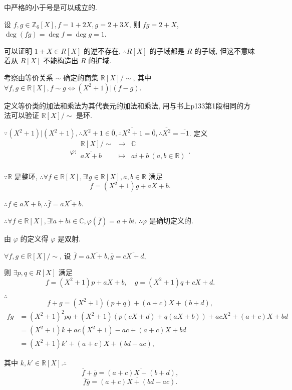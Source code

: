 \documentclass[color=black,device=normal,lang=cn,mode=geye]{elegantnote}
\begin{document}
中严格的小于号是可以成立的.
\begin{example}
    设 $f,g\in\mathbb{Z}_6[X],f=1+2X,g=2+3X$, 则 $fg=2+X$, $\deg(fg)=\deg f=\deg g=1$.

    可以证明 $1+X\in R[X]$ 的逆不存在, $\therefore R[X]$ 的子域都是 $R$ 的子域, 但这不意味着从 $R[X]$ 不能构造出 $R$ 的扩域.
\end{example}
\begin{example}
    考察由等价关系 $\sim$ 确定的商集 $ \mathbb{R}[X]/\sim$, 其中 $\forall f,g\in\mathbb{R}[X],f\sim g\Leftrightarrow(X^2+1)|(f-g)$.

    定义等价类的加法和乘法为其代表元的加法和乘法, 用与书上p133第1段相同的方法可以验证 $ \mathbb{R}[X]/\sim$ 是环.

    $\because(X^2+1)|(X^2+1),\therefore X^2+1\in\overline{0},\therefore\overline{X^2+1}=\overline{0},\therefore\overline{X^2}=\overline{-1}$. 定义
    \[\varphi:\begin{array}{rcl}
         \mathbb{R}[X]/\sim & \to & \mathbb{C} \\[6pt]
        \overline{aX+b} & \mapsto & ai+b\ (a,b\in\mathbb{R}) \\
    \end{array}.\]

    $\because\mathbb{R}$ 是整环, $\therefore\forall f\in\mathbb{R}[X],\exists!g\in\mathbb{R}[X],a,b\in\mathbb{R}$ 满足
    \[f=(X^2+1)g+aX+b.\]

    $\therefore f\in aX+b,\therefore\overline{f}=\overline{aX+b}$.

    $\therefore\forall f\in\mathbb{R}[X],\exists! a+bi\in\mathbb{C},\varphi(\overline{f})=a+bi$. $\therefore\varphi$ 是确切定义的.

    由 $\varphi$ 的定义得 $\varphi$ 是双射.

    $\forall f,g\in \mathbb{R}[X]/\sim$, 设 $\overline{f}=\overline{aX+b},\overline{g}=\overline{cX+d}$,

    则 $\exists p,q\in R[X]$ 满足
    \[f=(X^2+1)p+aX+b,\quad g=(X^2+1)q+cX+d.\]

    $\therefore$
    \[f+g=(X^2+1)(p+q)+(a+c)X+(b+d),\]
    \begin{align*}
        fg & =(X^2+1)^2pq+(X^2+1)(p(cX+d)+q(aX+b))+acX^2+(a+c)X+bd \\
        & =(X^2+1)k+ac(X^2+1)-ac+(a+c)X+bd \\
        & =(X^2+1)k'+(a+c)X+(bd-ac),
    \end{align*}

    其中 $k,k'\in\mathbb{R}[X].\therefore$
    \[\overline{f}+\overline{g}=\overline{(a+c)X+(b+d)},\]
    \[\overline{f}\overline{g}=\overline{(a+c)X+(bd-ac)}.\]


\end{example}
\end{document}
